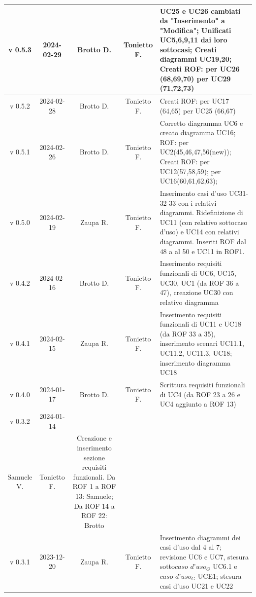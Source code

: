 \documentclass[12pt, oneside]{article}
\begin{document}
\begin{longtable}{|c|c|c|c|p{7cm}|}
\hline
v 0.5.3 & 2024-02-29 & Brotto D. & Tonietto F. & UC25 e UC26 cambiati da "Inserimento" a "Modifica";
\newline Unificati UC5,6,9,11 dai loro sottocasi;
\newline Creati diagrammi UC19,20;
\newline Creati ROF:
\newline per UC26 (68,69,70)
\newline per UC29 (71,72,73)
\\
\hline
v 0.5.2 & 2024-02-28 & Brotto D. & Tonietto F. & Creati ROF:
\newline per UC17 (64,65) 
\newline per UC25 (66,67)
\\
\hline
v 0.5.1 & 2024-02-26 & Brotto D. & Tonietto F. & Corretto diagramma UC6 e creato diagramma UC16; \newline ROF: per UC2(45,46,47,56(new)); 
\newline Creati ROF: \newline per UC12(57,58,59); \newline per UC16(60,61,62,63); \\
\hline
v 0.5.0 & 2024-02-19 & Zaupa R. & Tonietto F. & Inserimento casi d'uso UC31-32-33 con i relativi diagrammi. Ridefinizione di UC11 (con relativo sottocaso d'uso) e UC14 con relativi diagrammi. Inseriti ROF dal 48 a al 50 e UC11 in ROF1. \\
\hline
v 0.4.2 & 2024-02-16 & Brotto D. & Tonietto F. & Inserimento requisiti funzionali di UC6, UC15, UC30, UC1 (da ROF 36 a 47), creazione UC30 con relativo diagramma \\
\hline
v 0.4.1 & 2024-02-15 & Zaupa R. & Tonietto F. & Inserimento requisiti funzionali di UC11 e UC18 (da ROF 33 a 35), inserimento scenari UC11.1, UC11.2, UC11.3, UC18; inserimento diagramma UC18 \\
\hline
v 0.4.0 & 2024-01-17 & Brotto D. & Tonietto F. & Scrittura requisiti funzionali di UC4 (da ROF 23 a 26 e UC4 aggiunto a ROF 13) \\
\hline
v 0.3.2 & 2024-01-14 & 
\begin{tabular}[c]{@{}c@{}}
    Davide B. \\
    Samuele V.
  \end{tabular} 
& Tonietto F. & Creazione e inserimento sezione requisiti funzionali. Da ROF 1 a ROF 13: Samuele; Da ROF 14 a ROF 22: Brotto\\
\hline
v 0.3.1 & 2023-12-20 & Zaupa R. & Tonietto F. & Inserimento diagrammi dei casi d'uso dal 4 al 7; revisione  UC6 e UC7, stesura sotto$\textit{caso d'uso}_G$ UC6.1 e $\textit{caso d'uso}_G$ UCE1; stesura casi d'uso UC21 e UC22 \\

\end{longtable}
\end{document}
